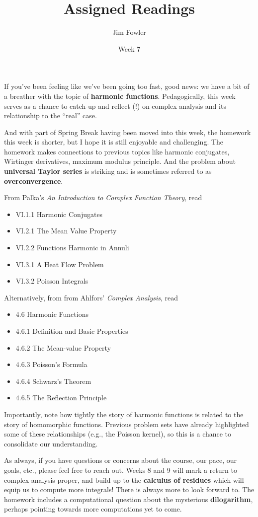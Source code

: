 \documentclass{homework}
\author{Jim Fowler}
\title{Assigned Readings}
\date{Week 7}
\begin{document}
\maketitle

If you've been feeling like we've been going too fast, good news: we
have a bit of a breather with the topic of \textbf{harmonic
  functions}.  Pedagogically, this week serves as a chance to catch-up
and reflect (!) on complex analysis and its relationship to the
``real'' case.

And with part of Spring Break having been moved into this week, the
homework this week is shorter, but I hope it is still enjoyable and
challenging.  The homework makes connections to previous topics like
harmonic conjugates, Wirtinger derivatives, maximum modulus principle.
And the problem about \textbf{universal Taylor series} is striking and
is sometimes referred to as \textbf{overconvergence}.

From Palka's \textit{An Introduction to Complex Function Theory}, read
\begin{itemize}
\item VI.1.1 Harmonic Conjugates
\item VI.2.1 The Mean Value Property
\item VI.2.2 Functions Harmonic in Annuli
\item VI.3.1 A Heat Flow Problem
\item VI.3.2 Poisson Integrals
\end{itemize}
Alternatively, from from Ahlfors' \textit{Complex Analysis}, read
\begin{itemize}
\item 4.6 Harmonic Functions
\item 4.6.1 Definition and Basic Properties
\item 4.6.2 The Mean-value Property
\item 4.6.3 Poisson's Formula
\item 4.6.4 Schwarz's Theorem
\item 4.6.5 The Reflection Principle
\end{itemize}
Importantly, note how tightly the story of harmonic functions is
related to the story of homomorphic functions.  Previous problem sets
have already highlighted some of these relationships (e.g., the
Poisson kernel), so this is a chance to consolidate our understanding.

As always, if you have questions or concerns about the course, our
pace, our goals, etc., please feel free to reach out.  Weeks 8 and 9
will mark a return to complex analysis proper, and build up to the
\textbf{calculus of residues} which will equip us to compute more
integrals!  There is always more to look forward to.  The homework
includes a computational question about the mysterious
\textbf{dilogarithm}, perhaps pointing towards more computations yet
to come.
\end{document}
